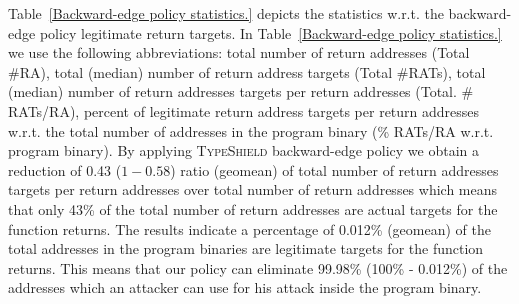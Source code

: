 Table~\ref{Backward-edge policy statistics.} depicts the statistics w.r.t. the backward-edge policy legitimate return targets.
In Table~\ref{Backward-edge policy statistics.} we use the following abbreviations:
total number of return addresses (Total \#RA),
total (median) number of return address targets (Total \#RATs),
total (median) number of return addresses targets per return addresses (Total. \# RATs/RA),
percent of legitimate return address targets per return addresses w.r.t. the total number of addresses in the program binary (\% RATs/RA w.r.t. program binary).
By applying \textsc{TypeShield} backward-edge policy we obtain a reduction of 0.43 ($1-0.58$) ratio (geomean)
of total number of return addresses targets per return addresses over total number of return addresses which means that only 43\% of the total number of return addresses are actual targets
for the function returns. The results indicate a percentage of 0.012\% (geomean) of the total addresses in the program binaries are legitimate targets for the function returns. This means
that our policy can eliminate 99.98\% (100\% - 0.012\%) of the addresses which an attacker can use for his attack inside the program binary.

% 
% 

